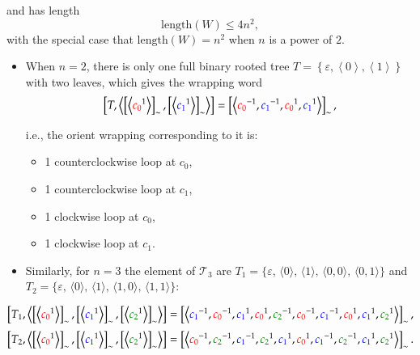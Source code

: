 \documentclass[11pt, a4paper, oneside]{article}
\theoremstyle{remark}
\theoremstyle{lemma}
\begin{document}
and has length 
\[
\mathrm{length}(W) \leq 4 n^2,
\]
with the special case that \(\mathrm{length}(W)=n^2\) when \(n\) is a power of \(2\).
\begin{itemize}
\item When $n = 2$, there is only one full binary rooted tree \(T = \left\{\varepsilon, \left\langle 0 \right\rangle, \left\langle 1 \right\rangle \right\}\) with two leaves, which gives the wrapping word
\[
\begin{aligned}
\left[ T, \left\langle 
\left[ \left\langle \textcolor{red}{c_0}^1 \right\rangle \right]_{\sim}, 
\left[ \left\langle \textcolor{blue}{c_1}^1 \right\rangle \right]_{\sim} 
\right\rangle \right] = \left[ \left\langle \textcolor{red}{c_0}^{-1}, \textcolor{blue}{c_1}^{-1}, 
                \textcolor{red}{c_0}^{1}, \textcolor{blue}{c_1}^{1} \right\rangle \right]_{\sim},
\end{aligned}
\]

i.e., the orient wrapping corresponding to it is: 
\begin{itemize}
    \item 1 counterclockwise loop at \( c_0 \),
    \item 1 counterclockwise loop at \( c_{1} \),
    \item 1 clockwise loop at \( c_0 \),
    \item 1 clockwise loop at \( c_{1} \).
\end{itemize}
\item Similarly, for \( n = 3 \) the element of \(\mathcal{T}_3\) are \(T_1=\{\varepsilon,\,\langle 0\rangle,\,\langle 1\rangle,\,\langle 0,0\rangle,\,\langle 0,1\rangle\}\) and \(T_2=\{\varepsilon,\,\langle 0\rangle,\,\langle 1\rangle,\,\langle 1,0\rangle,\,\langle 1,1\rangle\}\):
\end{itemize}
\[
\left[T_1,\left\langle\left[\left\langle\textcolor{red}{c_0}^{1}\right\rangle\right]_{\sim},\left[\left\langle\textcolor{blue}{c_1}^{1}\right\rangle\right]_{\sim},\left[\left\langle\textcolor{green!50!black}{c_2}^{1}\right\rangle\right]_{\sim}\right\rangle\right]=\left[\left\langle\textcolor{blue}{c_1}^{-1},\textcolor{red}{c_0}^{-1},\textcolor{blue}{c_1}^{1},\textcolor{red}{c_0}^{1}, \textcolor{green!50!black}{c_2}^{-1},\textcolor{red}{c_0}^{-1},\textcolor{blue}{c_1}^{-1},\textcolor{red}{c_0}^{1},\textcolor{blue}{c_1}^{1}, \textcolor{green!50!black}{c_2}^{1} \right\rangle\right]_{\sim},
\]
\[
\left[T_2,\left\langle\left[\left\langle\textcolor{red}{c_0}^{1}\right\rangle\right]_{\sim},\left[\left\langle\textcolor{blue}{c_1}^{1}\right\rangle\right]_{\sim},\left[\left\langle\textcolor{green!50!black}{c_2}^{1}\right\rangle\right]_{\sim}\right\rangle\right]=\left[\left\langle \textcolor{red}{c_0}^{-1},\textcolor{green!50!black}{c_2}^{-1},\textcolor{blue}{c_1}^{-1},\textcolor{green!50!black}{c_2}^{1},\textcolor{blue}{c_1}^{1}, \textcolor{red}{c_0}^{1}, \textcolor{blue}{c_1}^{-1},\textcolor{green!50!black}{c_2}^{-1},\textcolor{blue}{c_1}^{1}, \textcolor{green!50!black}{c_2}^{1}\right\rangle\right]_{\sim}.
\]
\end{document}
